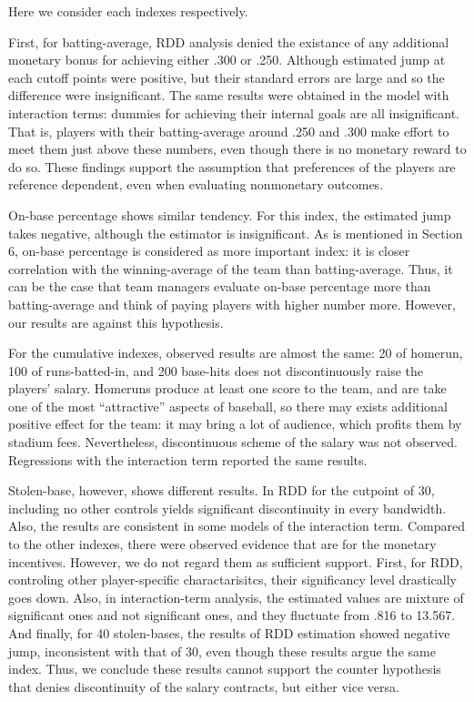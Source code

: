 \documentclass[dvipdfmx, 12pt]{article}
\begin{document}
Here we consider each indexes respectively.

First, for batting-average, RDD analysis denied the existance of any additional monetary bonus for achieving either .300 or .250. Although estimated jump at each cutoff points were positive, but their standard errors are large and so the difference were insignificant. The same results were obtained in the model with interaction terms: dummies for achieving their internal goals are all insignificant. That is, players with their batting-average around .250 and .300 make effort to meet them just above these numbers, even though there is no monetary reward to do so. These findings support the assumption that preferences of the players are reference dependent, even when evaluating nonmonetary outcomes.

On-base percentage shows similar tendency. For this index, the estimated jump takes negative, although the estimator is insignificant. As is mentioned in Section 6, on-base percentage is considered as more important index: it is closer correlation with the winning-average of the team than batting-average. Thus, it can be the case that team managers evaluate on-base percentage more than batting-average and think of paying players with higher number more. However, our results are against this hypothesis.

For the cumulative indexes, observed results are almost the same: 20 of homerun, 100 of runs-batted-in, and 200 base-hits does not discontinuously raise the players' salary. Homeruns produce at least one score to the team, and are take one of the most ``attractive'' aspects of baseball, so there may exists additional positive effect for the team: it may bring a lot of audience, which profits them by stadium fees. Nevertheless, discontinuous scheme of the salary was not observed. Regressions with the interaction term reported the same results.

Stolen-base, however, shows different results. In RDD for the cutpoint of 30, including no other controls yields significant discontinuity in every bandwidth. Also, the results are consistent in some models of the interaction term. Compared to the other indexes, there were observed evidence that are for the monetary incentives. However, we do not regard them as sufficient support. First, for RDD, controling other player-specific charactarisitcs, their significancy level drastically goes down. Also, in interaction-term analysis, the estimated values are mixture of significant ones and not significant ones, and they fluctuate from .816 to 13.567. And finally, for 40 stolen-bases, the results of RDD estimation showed negative jump, inconsistent with that of 30, even though these results argue the same index. Thus, we conclude these results cannot support the counter hypothesis that denies discontinuity of the salary contracts, but either vice versa.
\end{document}
